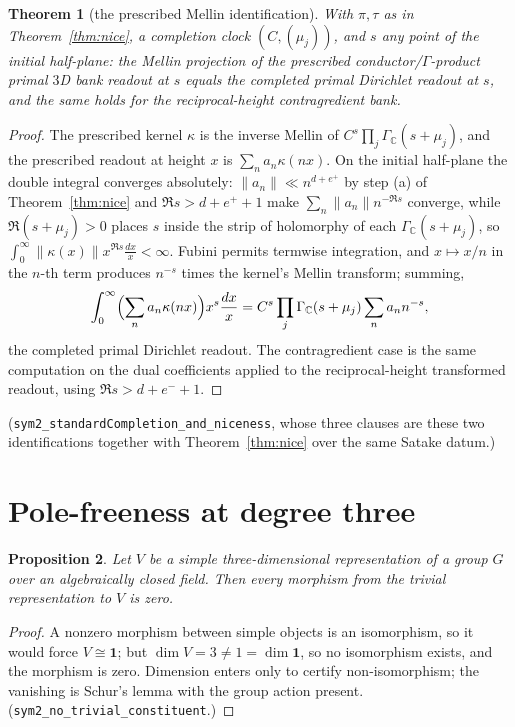 \documentclass[11pt]{article}
\newtheorem{theorem}{Theorem}
\newtheorem{proposition}[theorem]{Proposition}
\newcommand{\Gm}{\Gamma_{\mathbb C}}
\begin{document}
\begin{theorem}[the prescribed Mellin identification]\label{thm:std}
With $\pi,\tau$ as in Theorem~\ref{thm:nice}, a completion clock $(C,(\mu_j))$, and $s$ any point
of the initial half-plane: the Mellin projection of the prescribed conductor/$\Gamma$-product
primal $3$D bank readout at $s$ equals the completed primal Dirichlet readout at $s$, and the same
holds for the reciprocal-height contragredient bank.
\end{theorem}
\begin{proof}
The prescribed kernel $\kappa$ is the inverse Mellin of $C^{s}\prod_j\Gm(s+\mu_j)$, and the
prescribed readout at height $x$ is $\sum_n a_n\kappa(nx)$. On the initial half-plane the double
integral converges absolutely: $\|a_n\|\ll n^{d+e^{+}}$ by step (a) of Theorem~\ref{thm:nice} and
$\Re s>d+e^{+}+1$ make $\sum_n\|a_n\|n^{-\Re s}$ converge, while $\Re(s+\mu_j)>0$ places $s$
inside the strip of holomorphy of each $\Gm(s+\mu_j)$, so
$\int_0^\infty\|\kappa(x)\|x^{\Re s}\frac{dx}{x}<\infty$. Fubini permits termwise integration, and
$x\mapsto x/n$ in the $n$-th term produces $n^{-s}$ times the kernel's Mellin transform; summing,
\[
  \int_0^\infty\Bigl(\sum_n a_n\kappa(nx)\Bigr)x^{s}\frac{dx}{x}
   =C^{s}\prod_j\Gm(s+\mu_j)\sum_n a_nn^{-s},
\]
the completed primal Dirichlet readout. The contragredient case is the same computation on the
dual coefficients applied to the reciprocal-height transformed readout, using $\Re s>d+e^{-}+1$.
\end{proof}

\noindent(\texttt{sym2\_standardCompletion\_and\_niceness}, whose three clauses are these two
identifications together with Theorem~\ref{thm:nice} over the same Satake datum.)

\section{Pole-freeness at degree three}

\begin{proposition}\label{prop:pole}
Let $V$ be a simple three-dimensional representation of a group $G$ over an algebraically closed
field. Then every morphism from the trivial representation to $V$ is zero.
\end{proposition}
\begin{proof}
A nonzero morphism between simple objects is an isomorphism, so it would force $V\cong\mathbf 1$;
but $\dim V=3\ne1=\dim\mathbf 1$, so no isomorphism exists, and the morphism is zero. Dimension
enters only to certify non-isomorphism; the vanishing is Schur's lemma with the group action
present. (\texttt{sym2\_no\_trivial\_constituent}.)
\end{proof}
\end{document}
